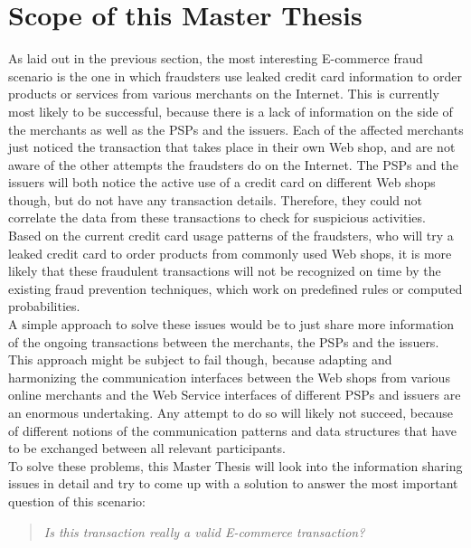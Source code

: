 
\section{Scope of this Master Thesis}
\label{sec:scope_thesis}

As laid out in the previous section, the most interesting \gls{E-commerce} fraud scenario is the one in which fraudsters use leaked credit card information to order products or services from various merchants on the Internet. This is currently most likely to be successful, because there is a lack of information on the side of the merchants as well as the \gls{PSP}s and the issuers. Each of the affected merchants just noticed the transaction that takes place in their own Web shop, and are not aware of the other attempts the fraudsters do on the Internet. The \gls{PSP}s and the issuers will both notice the active use of a credit card on different Web shops though, but do not have any transaction details. Therefore, they could not correlate the data from these transactions to check for suspicious activities. \\

Based on the current credit card usage patterns of the fraudsters, who will try a leaked credit card to order products from commonly used Web shops, it is more likely that these fraudulent transactions will not be recognized on time by the existing fraud prevention techniques, which work on predefined rules or computed probabilities. \\

A simple approach to solve these issues would be to just share more information of the ongoing transactions between the merchants, the \gls{PSP}s and the issuers. This approach might be subject to fail though, because adapting and harmonizing the communication interfaces between the Web shops from various online merchants and the Web Service interfaces of different \gls{PSP}s and issuers are an enormous undertaking. Any attempt to do so will likely not succeed, because of different notions of the communication patterns and data structures that have to be exchanged between all relevant participants. \\

To solve these problems, this Master Thesis will look into the information sharing issues in detail and try to come up with a solution to answer the most important question of this scenario: \@

\begin{quotation}
  \textit{Is this transaction really a valid \gls{E-commerce} transaction?}
\end{quotation}

